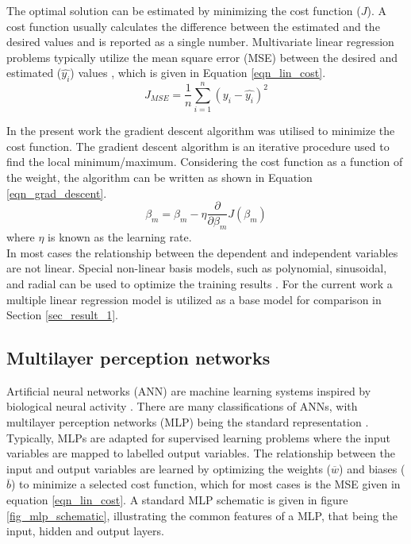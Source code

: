 \documentclass[a4paper,fleqn]{cas-sc}
\begin{document}
The optimal solution can be estimated by minimizing the cost function ($J$). A cost function usually calculates the difference between the estimated and the desired values and is reported as a single number. Multivariate linear regression problems typically utilize the mean square error (MSE) between the desired and estimated ($\hat{y_i}$)  values \cite{Wheeler2019}, which is given in Equation \ref{eqn_lin_cost}.
 \begin{equation}\label{eqn_lin_cost}
J_{MSE}=\frac{1}{n}\sum^n_{i=1}(y_i-\hat{y_i})^2
\end{equation} 

In the present work the gradient descent algorithm \cite{Wen2022} was utilised to minimize the cost function. The gradient descent algorithm is an iterative procedure used to find the local minimum/maximum. Considering the cost function as a function of the weight, the algorithm can be written as shown in Equation \ref{eqn_grad_descent}.  
\begin{equation}\label{eqn_grad_descent}
\beta_{m} = \beta_m-\eta\frac{\partial}{\partial\beta_m}J(\beta_m)
\end{equation}
where $\eta$ is known as the learning rate.\\

In most cases the relationship between the dependent and independent variables are not linear. Special non-linear basis models, such as polynomial, sinusoidal, and radial can be used to optimize the training results \cite{Rasmussen2006}. For the current work a multiple linear regression model is utilized as a base model for comparison in Section \ref{sec_result_1}. 
\subsection{Multilayer perception networks}
Artificial neural networks (ANN) are machine learning systems inspired by biological neural activity \cite{Rasmussen2006}. There are many classifications of ANNs, with multilayer perception networks (MLP) being the standard representation \citep{goodfellow}. Typically, MLPs are adapted for supervised learning problems where the input variables are mapped to labelled output variables. The relationship between the input and output variables are learned by optimizing the weights ($\overline{w}$) and biases ($\overline{b}$) to minimize a selected cost function, which for most cases is the MSE given in equation \ref{eqn_lin_cost}. A standard MLP schematic is given in figure \ref{fig_mlp_schematic}, illustrating the common features of a MLP, that being the input, hidden and output layers.\\
\end{document}
